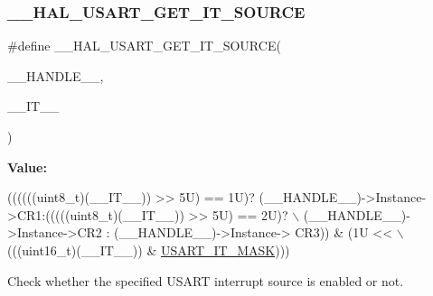 \subsubsection{\texorpdfstring{\+\_\+\+\_\+\+H\+A\+L\+\_\+\+U\+S\+A\+R\+T\+\_\+\+G\+E\+T\+\_\+\+I\+T\+\_\+\+S\+O\+U\+R\+CE}{\_\_HAL\_USART\_GET\_IT\_SOURCE}}
{\footnotesize\ttfamily \#define \+\_\+\+\_\+\+H\+A\+L\+\_\+\+U\+S\+A\+R\+T\+\_\+\+G\+E\+T\+\_\+\+I\+T\+\_\+\+S\+O\+U\+R\+CE(\begin{DoxyParamCaption}\item[{}]{\+\_\+\+\_\+\+H\+A\+N\+D\+L\+E\+\_\+\+\_\+,  }\item[{}]{\+\_\+\+\_\+\+I\+T\+\_\+\+\_\+ }\end{DoxyParamCaption})}

{\bfseries Value\+:}
\begin{DoxyCode}
((((((uint8\_t)(\_\_IT\_\_)) >> 5U) == 1U)? (\_\_HANDLE\_\_)->Instance->CR1:(((((uint8\_t)(\_\_IT\_\_)) >> 5U) == 2U)? \(\backslash\)
                                                   (\_\_HANDLE\_\_)->Instance->CR2 : (\_\_HANDLE\_\_)->Instance->
      CR3)) & (1U << \(\backslash\)
                                                   (((uint16\_t)(\_\_IT\_\_)) & 
      \hyperlink{group___u_s_a_r_t___interruption___mask_ga034341c78baf4241878310a22ec76a06}{USART\_IT\_MASK})))
\end{DoxyCode}


Check whether the specified U\+S\+A\+RT interrupt source is enabled or not. 


